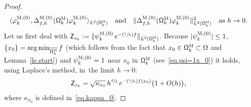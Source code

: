 \documentclass[10pt]{amsart}
\newcommand{\Psfrac}[2]{(\sfrac{#1}{#2})}
\newcommand{\quand}{\quad\text{and}\quad}
\DeclareMathOperator*{\argmin}{arg\,min}
\theoremstyle{plain}
\theoremstyle{definition}
\begin{document}
\begin{proof}
\vspace*{-\baselineskip}
\[
\langle \varphi^{\textsc{M},(0)}_k,\Delta_{f,h}^{\textsc{M}, (0)}(\mathsf \Omega_k^{\textsc{M}}) \varphi^{\textsc{M},(0)}_k \rangle_{L^2(\mathsf \Omega_k^{\textsc{M}})}\quand\Vert \Delta_{f,h}^{\textsc{M}, (0)}(\mathsf \Omega_k^{\textsc{M}})\varphi^{\textsc{M},(0)}_k \Vert_{L^2(\mathsf \Omega_k^{\textsc{M}})}^2\quad\text{as $h\to 0$.}
\]
Let us first deal with $\mathsf Z_{z_k}:=\Vert \psi^{\textsc{M},(0)}_k\, e^{-\Psfrac 1hf} \Vert_{L^2(\mathsf \Omega_k^{\textsc{M}})} $. Because $|\psi^{\textsc{M},(0)}_k|\le 1$, $\{x_0\}= \argmin_{\overline{\mathsf \Omega_k^{\textsc{M}}}} f$ (which follows from the fact that $x_0\in \mathsf \Omega_k^{\textsc{M}} \subset \Omega$ and Lemma~\ref{le.start}) and $\psi^{\textsc{M},(0)}_k=1$ near $x_0$ in $\mathsf \Omega_k^{\textsc{M}}$ (see~\eqref{eq.psi=1x_0})
it holds, using Laplace's method, in~the limit $h\to 0$:
\begin{equation}\label{lap.x0K}
\mathsf Z_{z_k}= \sqrt{\kappa_{x_0}}\, h^{\sfrac d4}\, e^{-\Psfrac 1h f(x_0)} \bigl(1+O(h)\bigr),
\end{equation}
where $\kappa_{x_0}$ is defined in~\eqref{eq.kappa_0}.


\end{proof}
\end{document}
